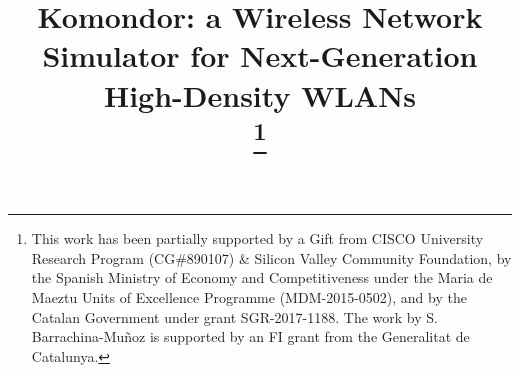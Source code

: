 \documentclass[conference]{IEEEtran}
\begin{document}
	
	\title{Komondor: a Wireless Network Simulator for Next-Generation High-Density WLANs\\
		\thanks{This work has been partially supported by a Gift from CISCO University Research Program (CG\#890107) \& Silicon Valley Community Foundation, by the Spanish Ministry of Economy and Competitiveness under the Maria de Maeztu Units of Excellence Programme (MDM-2015-0502), and by the Catalan Government under grant SGR-2017-1188. The work by S. Barrachina-Mu\~noz is supported by an FI grant from the Generalitat de Catalunya.}
	}
	
	
	\author{
		\and
		\and
		\and
	}
	
\end{document}
